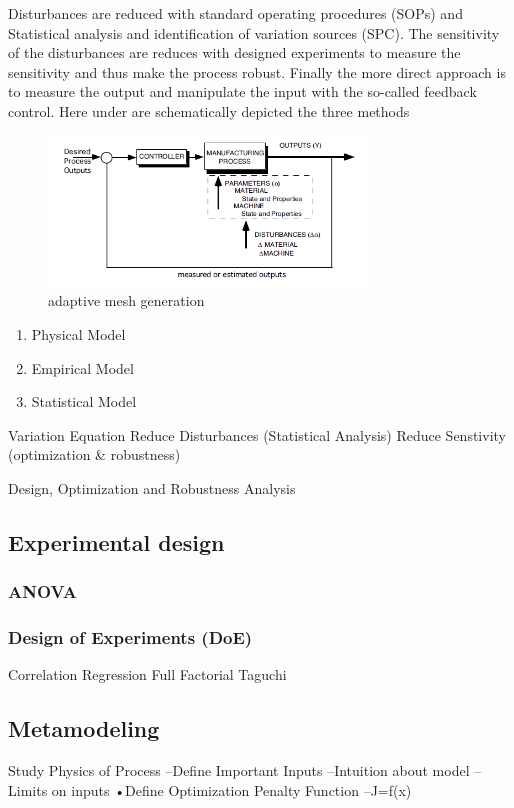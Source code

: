 Disturbances are reduced with standard operating procedures (SOPs) and Statistical analysis and identification of variation sources (SPC). The sensitivity of the disturbances are reduces with designed experiments to measure the sensitivity and thus make the process robust. Finally the more direct approach is to measure the output and manipulate the input with the so-called feedback control. Here under are schematically depicted the three methods 

\begin{figure}[h]
\centering
  \includegraphics[height=4cm]{img/directfb.PNG}
   \caption{adaptive mesh generation}
 \label{fgr:graft}
\end{figure}





\begin{enumerate}
\item Physical Model
\item Empirical Model
\item Statistical Model
\end{enumerate}


Variation Equation
Reduce Disturbances (Statistical Analysis)
Reduce Senstivity (optimization \& robustness)


 Design, Optimization and Robustness Analysis

\subsection{Experimental design}
\subsubsection{ANOVA}
\subsubsection{Design of Experiments (DoE)}
Correlation
Regression
Full Factorial
Taguchi


\subsection{Metamodeling}
Study Physics of Process
–Define Important Inputs
–Intuition about model
–Limits on inputs
•Define Optimization Penalty Function
–J=f(x)


